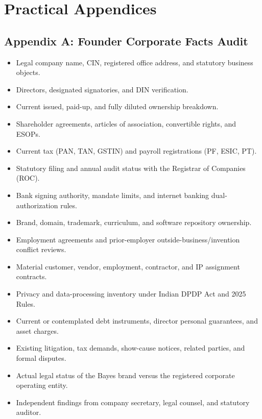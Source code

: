 \section*{Practical Appendices}

\subsection{Appendix A: Founder Corporate Facts Audit}

\begin{itemize}[leftmargin=*,itemsep=1.5pt]
\item[{[ ]}] Legal company name, CIN, registered office address, and statutory business objects.
\item[{[ ]}] Directors, designated signatories, and DIN verification.
\item[{[ ]}] Current issued, paid-up, and fully diluted ownership breakdown.
\item[{[ ]}] Shareholder agreements, articles of association, convertible rights, and ESOPs.
\item[{[ ]}] Current tax (PAN, TAN, GSTIN) and payroll registrations (PF, ESIC, PT).
\item[{[ ]}] Statutory filing and annual audit status with the Registrar of Companies (ROC).
\item[{[ ]}] Bank signing authority, mandate limits, and internet banking dual-authorization rules.
\item[{[ ]}] Brand, domain, trademark, curriculum, and software repository ownership.
\item[{[ ]}] Employment agreements and prior-employer outside-business/invention conflict reviews.
\item[{[ ]}] Material customer, vendor, employment, contractor, and IP assignment contracts.
\item[{[ ]}] Privacy and data-processing inventory under Indian DPDP Act and 2025 Rules.
\item[{[ ]}] Current or contemplated debt instruments, director personal guarantees, and asset charges.
\item[{[ ]}] Existing litigation, tax demands, show-cause notices, related parties, and formal disputes.
\item[{[ ]}] Actual legal status of the Bayes brand versus the registered corporate operating entity.
\item[{[ ]}] Independent findings from company secretary, legal counsel, and statutory auditor.
\end{itemize}


